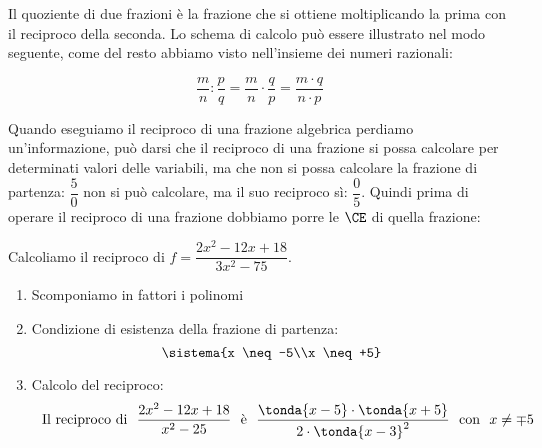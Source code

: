 Il quoziente di due frazioni è la frazione che si ottiene moltiplicando la 
prima con il reciproco della seconda.
Lo schema di calcolo può essere illustrato nel modo seguente, come del resto 
abbiamo visto nell'insieme dei numeri razionali:

\[\dfrac{m}{n}:\dfrac{p}{q}=\dfrac{m}{n} \cdot \dfrac{q}{p}=
  \dfrac{m \cdot q}{n \cdot p}\]


Quando eseguiamo il reciproco di una frazione algebrica perdiamo 
un'informazione, può darsi che il reciproco di una frazione si possa 
calcolare per determinati valori delle variabili, ma che non si possa 
calcolare la frazione di partenza:
\(\dfrac{5}{0}\) non si può calcolare, ma il suo reciproco sì: 
\(\dfrac{0}{5}\).
Quindi prima di operare il reciproco di una frazione dobbiamo porre le
\(\CE\) di quella frazione:

\begin{esempio}
Calcoliamo il reciproco di \(f=\dfrac{2x^2-12x+18}{3x^2-75}\).
\begin{enumerate}
\item Scomponiamo in fattori i polinomi
\item Condizione di esistenza della frazione di partenza:
\[\sistema{x \neq -5\\x \neq +5}\]
 \item Calcolo del reciproco:
\[\stext{Il reciproco di} \dfrac{2x^2-12x+18}{x^2-25} \stext{è}
\dfrac{\tonda{x-5} \cdot \tonda{x+5}}{2\cdot \tonda{x-3}^2} \stext{con}
x \neq \mp 5\]
\end{enumerate}

\end{esempio}


